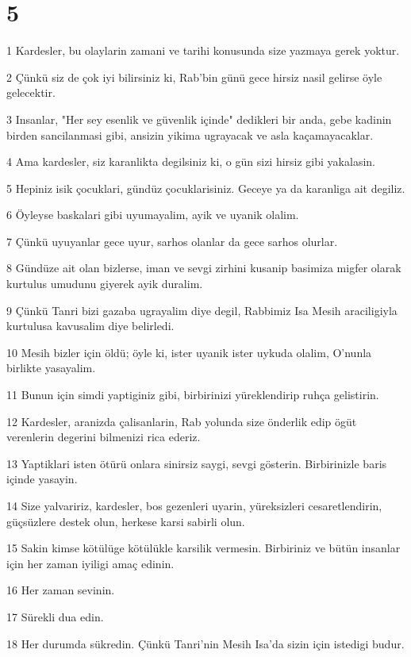 \chapter{5}

\par 1 Kardesler, bu olaylarin zamani ve tarihi konusunda size yazmaya gerek yoktur.
\par 2 Çünkü siz de çok iyi bilirsiniz ki, Rab'bin günü gece hirsiz nasil gelirse öyle gelecektir.
\par 3 Insanlar, "Her sey esenlik ve güvenlik içinde" dedikleri bir anda, gebe kadinin birden sancilanmasi gibi, ansizin yikima ugrayacak ve asla kaçamayacaklar.
\par 4 Ama kardesler, siz karanlikta degilsiniz ki, o gün sizi hirsiz gibi yakalasin.
\par 5 Hepiniz isik çocuklari, gündüz çocuklarisiniz. Geceye ya da karanliga ait degiliz.
\par 6 Öyleyse baskalari gibi uyumayalim, ayik ve uyanik olalim.
\par 7 Çünkü uyuyanlar gece uyur, sarhos olanlar da gece sarhos olurlar.
\par 8 Gündüze ait olan bizlerse, iman ve sevgi zirhini kusanip basimiza migfer olarak kurtulus umudunu giyerek ayik duralim.
\par 9 Çünkü Tanri bizi gazaba ugrayalim diye degil, Rabbimiz Isa Mesih araciligiyla kurtulusa kavusalim diye belirledi.
\par 10 Mesih bizler için öldü; öyle ki, ister uyanik ister uykuda olalim, O'nunla birlikte yasayalim.
\par 11 Bunun için simdi yaptiginiz gibi, birbirinizi yüreklendirip ruhça gelistirin.
\par 12 Kardesler, aranizda çalisanlarin, Rab yolunda size önderlik edip ögüt verenlerin degerini bilmenizi rica ederiz.
\par 13 Yaptiklari isten ötürü onlara sinirsiz saygi, sevgi gösterin. Birbirinizle baris içinde yasayin.
\par 14 Size yalvaririz, kardesler, bos gezenleri uyarin, yüreksizleri cesaretlendirin, güçsüzlere destek olun, herkese karsi sabirli olun.
\par 15 Sakin kimse kötülüge kötülükle karsilik vermesin. Birbiriniz ve bütün insanlar için her zaman iyiligi amaç edinin.
\par 16 Her zaman sevinin.
\par 17 Sürekli dua edin.
\par 18 Her durumda sükredin. Çünkü Tanri'nin Mesih Isa'da sizin için istedigi budur.
